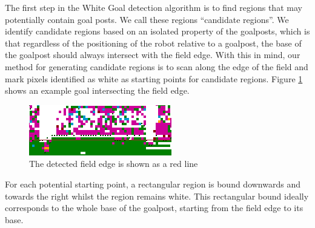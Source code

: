 \documentclass[runningheads,a4paper]{llncs}
\begin{document}
The first step in the White Goal detection algorithm is to find regions that may potentially contain goal posts. We call these regions ``candidate regions''. We identify candidate regions based on an isolated property of the goalposts, which is that regardless of the positioning of the robot relative to a goalpost, the base of the goalpost should always intersect with the field edge. With this in mind, our method for generating candidate regions is to scan along the edge of the field and mark pixels identified as white as starting points for candidate regions. Figure \ref{fig:saliencygoal} shows an example goal intersecting the field edge.

\begin{figure}[!ht]
\centering
\includegraphics[scale=1.5]{Figures/saliencygoal}
\caption{The detected field edge is shown as a red line}
\label{fig:saliencygoal}
\end{figure}

For each potential starting point, a rectangular region is bound downwards and towards the right whilst the region remains white. This rectangular bound ideally corresponds to the whole base of the goalpost, starting from the field edge to its base.
\end{document}
